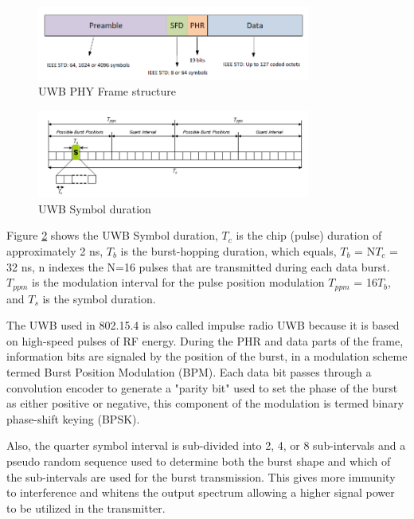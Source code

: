 \begin{figure}[h!]
    \includegraphics[width=0.8\textwidth]{figures/UWBPHYFrameStructure.png}
    \centering
    \caption[UWB PHY Frame structure]{UWB PHY Frame structure \protect\cite{DW1000UserManual}}
    \label{fig:UWB PHY Frame structure}    
\end{figure}

\begin{figure}[h!]
    \includegraphics[width=0.8\textwidth]{figures/ModulationandTimehoppingof802.15.4a.png}
    \centering
    \caption[UWB Symbol duration]{UWB Symbol duration \protect\cite{gutierrez2004low}}
    \label{fig:UWB Symbol duration}    
\end{figure}

Figure \ref{fig:UWB Symbol duration} shows the UWB Symbol duration, $T_c$ is the chip (pulse) duration of approximately 2 ns, $T_b$ is the burst-hopping duration, which equals, $T_b$ = N$T_c$ = 32 ns, n indexes the N=16 pulses that are transmitted during each data burst. $T_{ppm}$ is the modulation interval for the pulse position modulation $T_{ppm}$ = 16$T_b$, and $T_s$ is the symbol duration.

The UWB used in 802.15.4 is also called impulse radio UWB because it is based on high-speed pulses of RF energy. During the PHR and data parts of the frame, information bits are signaled by the position of the burst, in a modulation scheme termed Burst Position Modulation (BPM). Each data bit passes through a convolution encoder to generate a "parity bit" used to set the phase of the burst as either positive or negative, this component of the modulation is termed binary phase-shift keying (BPSK). 

Also, the quarter symbol interval is sub-divided into 2, 4, or 8 sub-intervals and a pseudo random sequence used to determine both the burst shape and which of the sub-intervals are used for the burst transmission. This gives more immunity to interference and whitens the output spectrum allowing a higher signal power to be utilized in the transmitter.


